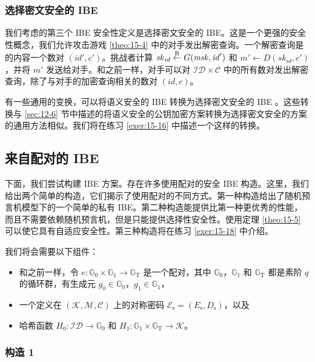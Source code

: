 \subsubsection{选择密文安全的 IBE}\label{subsubsec:15-6-2-3}

我们考虑的第三个 IBE 安全性定义是选择密文安全的 IBE。这是一个更强的安全性概念，我们允许攻击游戏 \ref{theo:15-4} 中的对手发出解密查询。一个解密查询是的内容一个数对 $(\mathit{id}',c')$。挑战者计算 $\mathit{sk}_\mathit{id}\overset{\rm R}\leftarrow G(\mathit{msk},\mathit{id}')$ 和 $m'\leftarrow D(\mathit{sk}_\mathit{id},c')$，并将 $m′$ 发送给对手。和之前一样，对手可以对 $\mathcal{ID}\times\mathcal{C}$ 中的所有数对发出解密查询，除了与对手的加密查询相关的数对 $(\mathit{id},c)$。

有一些通用的变换，可以将语义安全的 IBE 转换为选择密文安全的 IBE \cite{bentahar2008generic}。这些转换与 \ref{sec:12-6} 节中描述的将语义安全的公钥加密方案转换为选择密文安全的方案的通用方法相似。我们将在练习 \ref{exer:15-16} 中描述一个这样的转换。

\subsection{来自配对的 IBE}\label{subsec:15-6-3}

下面，我们尝试构建 IBE 方案。存在许多使用配对的安全 IBE 构造。这里，我们给出两个简单的构造，它们揭示了使用配对的不同方式。第一种构造给出了随机预言机模型下的一个简单的私有 IBE。第二种构造能提供比第一种更优秀的性能，而且不需要依赖随机预言机，但是只能提供选择性安全性。使用定理 \ref{theo:15-5} 可以使它具有自适应安全性。第三种构造将在练习 \ref{exer:15-18} 中介绍。

我们将会需要以下组件：
\begin{itemize}
	\item 和之前一样，令 $e:\mathbb{G}_0\times\mathbb{G}_1\to\mathbb{G}_\mathrm{T}$ 是一个配对，其中 $\mathbb{G}_0$，$\mathbb{G}_1$ 和 $\mathbb{G}_\mathrm{T}$ 都是素阶 $q$ 的循环群，有生成元 $g_0\in\mathbb{G}_0$，$g_1\in\mathbb{G}_1$，
	\item 一个定义在 $(\mathcal{K},\mathcal{M},\mathcal{C})$ 上的对称密码 $\mathcal{E}_\mathrm{s}=(E_\mathrm{s},D_\mathrm{s})$，以及
	\item 哈希函数 $H_0:\mathcal{ID}\to\mathbb{G}_0$ 和 $H_1:\mathbb{G}_1\times\mathbb{G}_\mathrm{T}\to\mathcal{K}$。
\end{itemize}

\subsubsection{构造 1}\label{subsubsec:15-6-3-1}

